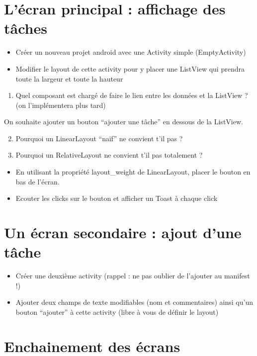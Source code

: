 \documentclass{article}
\begin{document}
\section{L'écran principal : affichage des tâches}
\begin{itemize}
  \item Créer un nouveau projet android avec une Activity simple (EmptyActivity)
  \item Modifier le layout de cette activity pour y placer une ListView qui
  prendra toute la largeur et toute la hauteur
\end{itemize}
\begin{enumerate}
 \setcounter{enumi}{0}
 \item Quel composant est chargé de faire le lien entre les données et la
 ListView ? (on l'implémentera plus tard)
 \end{enumerate}
 On souhaite ajouter un bouton ``ajouter une tâche'' en dessous de la ListView.
 \begin{enumerate}
 \setcounter{enumi}{1}
\item Pourquoi un LinearLayout ``naïf'' ne convient t'il pas ?
\item Pourquoi un RelativeLayout ne convient t'il pas totalement ?
\end{enumerate}
\begin{itemize}
  \item En utilisant la propriété layout\_weight de LinearLayout, placer le
  bouton en bas de l'écran.
  \item Ecouter les clicks sur le bouton et afficher un Toast à chaque click
\end{itemize}
\section{Un écran secondaire : ajout d'une tâche}
\begin{itemize}
  \item Créer une deuxième activity (rappel : ne pas oublier de l'ajouter au manifest !)
  \item Ajouter deux champs de texte modifiables (nom et commentaires) ainsi
  qu'un bouton ``ajouter'' à cette activity (libre à vous de définir le layout)
\end{itemize}
\section{Enchainement des écrans}
\end{document}
